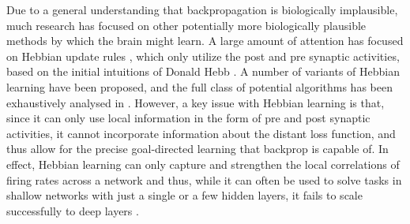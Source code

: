 Due to a general understanding that backpropagation is biologically implausible, much research has focused on other potentially more biologically plausible methods by which the brain might learn. A large amount of attention has focused on Hebbian update rules \citep{gerstner2002mathematical}, which only utilize the post and pre synaptic activities, based on the initial intuitions of Donald Hebb \citep{hebb1949first}. A number of variants of Hebbian learning have been proposed, and the full class of potential algorithms has been exhaustively analysed in \citep{baldi2016theory}. However, a key issue with Hebbian learning is that, since it can only use local information in the form of pre and post synaptic activities, it cannot incorporate information about the distant loss function, and thus allow for the precise goal-directed learning that backprop is capable of. In effect, Hebbian learning can only capture and strengthen the local correlations of firing rates across a network and thus, while it can often be used to solve tasks in shallow networks with just a single or a few hidden layers, it fails to scale successfully to deep layers \citep{lillicrap2019backpropagation}.

